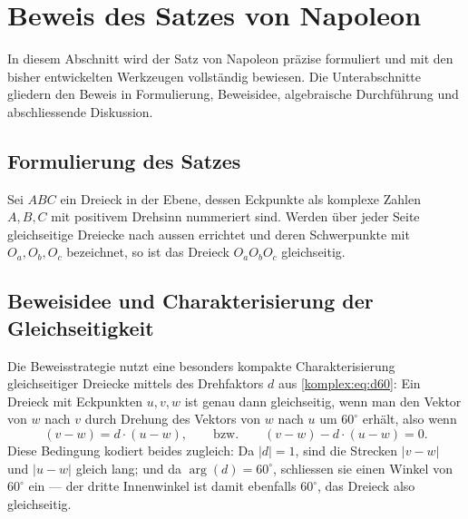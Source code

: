 %
%
\section{Beweis des Satzes von Napoleon
\label{komplex:section:beweis}}
In diesem Abschnitt wird der Satz von Napoleon präzise formuliert
und mit den bisher entwickelten Werkzeugen vollständig bewiesen.
Die Unterabschnitte gliedern den Beweis in Formulierung, Beweisidee,
algebraische Durchführung und abschliessende Diskussion.

%
%
\subsection{Formulierung des Satzes
\label{komplex:subsection:formulierung}}
\begin{satz}[Napoleon]
\label{komplex:satz:napoleon}
%
Sei $ABC$ ein Dreieck in der Ebene, dessen Eckpunkte als komplexe Zahlen
$A, B, C$ mit positivem Drehsinn nummeriert sind.
Werden über jeder Seite gleichseitige Dreiecke nach aussen errichtet
und deren Schwerpunkte mit $O_a, O_b, O_c$ bezeichnet,
so ist das Dreieck $O_a O_b O_c$ gleichseitig.
\end{satz}

%
%
\subsection{Beweisidee und Charakterisierung der Gleichseitigkeit
\label{komplex:subsection:beweisidee}}
Die Beweisstrategie nutzt eine besonders kompakte Charakterisierung
gleichseitiger Dreiecke mittels des Drehfaktors $d$ aus
\eqref{komplex:eq:d60}:
Ein Dreieck mit Eckpunkten $u, v, w$ ist genau dann gleichseitig,
wenn man den Vektor von $w$ nach $v$ durch Drehung des Vektors von $w$
nach $u$ um $60^\circ$ erhält, also wenn
\begin{equation}
(v - w)
=
d \cdot (u - w) ,
\qquad \text{bzw.} \qquad
(v - w) - d \cdot (u - w) = 0 .
\label{komplex:eq:charakterisierung}
\end{equation}
Diese Bedingung kodiert beides zugleich:
Da $|d| = 1$, sind die Strecken $|v - w|$ und $|u - w|$ gleich lang;
und da $\arg(d) = 60^\circ$, schliessen sie einen Winkel von $60^\circ$
ein --- der dritte Innenwinkel ist damit ebenfalls $60^\circ$,
das Dreieck also gleichseitig.

